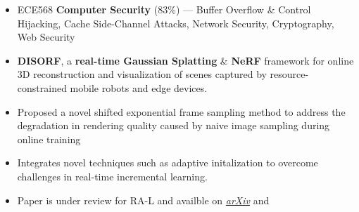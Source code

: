 \documentclass[10pt,a4paper,ragged2e,withhyper]{altacv}
\begin{document}
\begin{paracol}{2}
\begin{itemize}
        \item ECE568 \textbf{Computer Security} (83\%) --- Buffer Overflow \& Control Hijacking, Cache Side-Channel Attacks, Network Security, Cryptography, Web Security
    \end{itemize}

    \switchcolumn{}

    \begin{itemize}
        \item \textbf{DISORF}, a \textbf{real-time Gaussian Splatting} \& \textbf{NeRF} framework for online 3D
              reconstruction and visualization of scenes captured by resource-constrained mobile robots and edge devices.
        \item Proposed a novel shifted exponential frame sampling method to address the degradation in rendering quality caused by naive image sampling during online training
        \item Integrates novel techniques  such as adaptive initalization to overcome challenges in real-time incremental learning.
        \item Paper is under review for RA-L and availble on \href{https://arxiv.org/abs/2403.00228}{\textit{arXiv}} and 
    \end{itemize}



\end{paracol}
\end{document}
